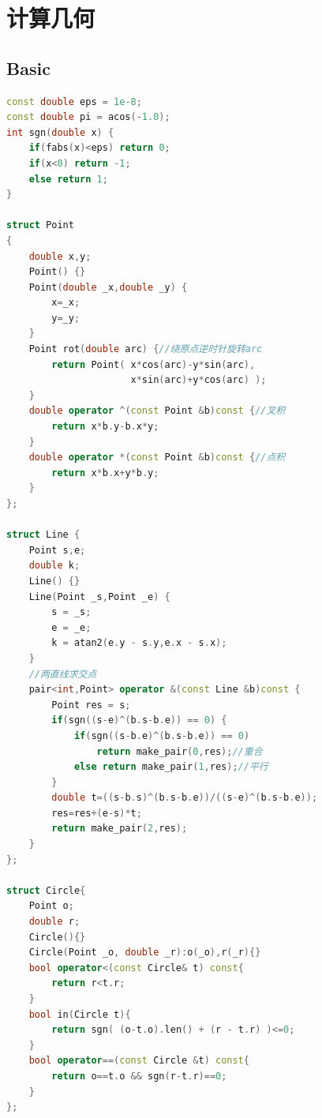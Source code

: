 \documentclass[UTF8,a4paper,titlepage]{ctexart}
\begin{document}
    \section{计算几何}
\subsection{Basic}
\begin{lstlisting}[language=C++]
const double eps = 1e-8;
const double pi = acos(-1.0);
int sgn(double x) {
    if(fabs(x)<eps) return 0;
    if(x<0) return -1;
    else return 1;
}

struct Point
{
    double x,y;
    Point() {}
    Point(double _x,double _y) {
        x=_x;
        y=_y;
    }
    Point rot(double arc) {//绕原点逆时针旋转arc
        return Point( x*cos(arc)-y*sin(arc),
                      x*sin(arc)+y*cos(arc) );
    }
    double operator ^(const Point &b)const {//叉积
        return x*b.y-b.x*y;
    }
    double operator *(const Point &b)const {//点积
        return x*b.x+y*b.y;
    }
};

struct Line {
    Point s,e;
    double k;
    Line() {}
    Line(Point _s,Point _e) {
        s = _s;
        e = _e;
        k = atan2(e.y - s.y,e.x - s.x);
    }
    //两直线求交点
    pair<int,Point> operator &(const Line &b)const {
        Point res = s;
        if(sgn((s-e)^(b.s-b.e)) == 0) {
            if(sgn((s-b.e)^(b.s-b.e)) == 0)
                return make_pair(0,res);//重合
            else return make_pair(1,res);//平行
        }
        double t=((s-b.s)^(b.s-b.e))/((s-e)^(b.s-b.e));
        res=res+(e-s)*t;
        return make_pair(2,res);
    }
};

struct Circle{
    Point o;
    double r;
    Circle(){}
    Circle(Point _o, double _r):o(_o),r(_r){}
    bool operator<(const Circle& t) const{
        return r<t.r;
    }
    bool in(Circle t){
        return sgn( (o-t.o).len() + (r - t.r) )<=0;
    }
    bool operator==(const Circle &t) const{
        return o==t.o && sgn(r-t.r)==0;
    }
};


\end{lstlisting}
\end{document}
